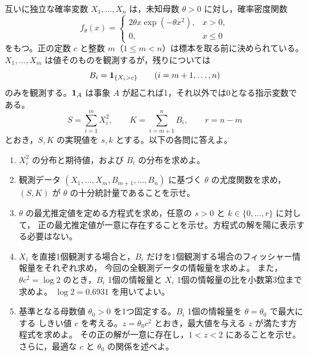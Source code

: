 \documentclass[a4paper,11pt]{ltjsarticle}
\begin{document}
互いに独立な確率変数 $X_1,\ldots,X_n$ は，未知母数 $\theta>0$ に対し，確率密度関数
\[
f_\theta(x)=
\begin{cases}
2\theta x\exp(-\theta x^2),&x>0,\\
0,&x\leq0
\end{cases}
\]
をもつ。正の定数 $c$ と整数 $m$（$1\leq m<n$）は標本を取る前に決められている。
$X_1,\ldots,X_m$ は値そのものを観測するが，残りについては
\[
B_i=\mathbf{1}_{\{X_i>c\}}\qquad(i=m+1,\ldots,n)
\]
のみを観測する。$\mathbf{1}_A$ は事象 $A$ が起これば1，それ以外では0となる指示変数である。
\[
S=\sum_{i=1}^{m}X_i^2,\qquad K=\sum_{i=m+1}^{n}B_i,\qquad r=n-m
\]
とおき，$S,K$ の実現値を $s,k$ とする。以下の各問に答えよ。
\begin{enumerate}
\item $X_i^2$ の分布と期待値，および $B_i$ の分布を求めよ。
\item 観測データ $(X_1,\ldots,X_m,B_{m+1},\ldots,B_n)$ に基づく $\theta$ の尤度関数を求め，
$(S,K)$ が $\theta$ の十分統計量であることを示せ。
\item $\theta$ の最尤推定値を定める方程式を求め，任意の $s>0$ と $k\in\{0,\ldots,r\}$ に対して，
正の最尤推定値が一意に存在することを示せ。方程式の解を陽に表示する必要はない。
\item $X_i$ を直接1個観測する場合と，$B_i$ だけを1個観測する場合のフィッシャー情報量をそれぞれ求め，
今回の全観測データの情報量を求めよ。
また，$\theta c^2=\log2$ のとき，$B_i$ 1個の情報量と $X_i$ 1個の情報量の比を小数第3位まで求めよ。
$\log2=0.6931$ を用いてよい。
\item 基準となる母数値 $\theta_0>0$ を1つ固定する。$B_i$ 1個の情報量を $\theta=\theta_0$ で最大にする
しきい値 $c$ を考える。$z=\theta_0c^2$ とおき，最大値を与える $z$ が満たす方程式を求めよ。
その正の解が一意に存在し，$1<z<2$ にあることを示せ。さらに，最適な $c$ と $\theta_0$ の関係を述べよ。
\end{enumerate}
\newpage
\end{document}
